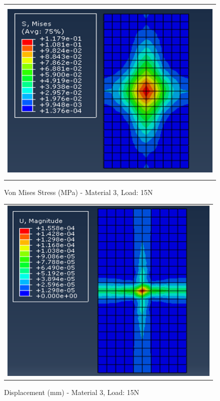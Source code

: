 \documentclass[a4paper,12pt]{article}
\numberwithin{equation}{section}
\numberwithin{figure}{section}
\begin{document}
\begin{figure}[H]
  \centering
  \begin{tabular}{@{}c@{}}
    \includegraphics[width=0.7\linewidth,height=255pt]{Results/Point Loading/M3_VMS_L3.png} \\
  \end{tabular}
  \caption{Von Mises Stress (MPa) - Material 3, Load: 15N}
\end{figure}

\begin{figure}[H]
  \centering
  \begin{tabular}{@{}c@{}}
    \includegraphics[width=0.7\linewidth,height=255pt]{Results/Point Loading/M3_DIS_L3.png} \\
  \end{tabular}
  \caption{Displacement (mm) - Material 3, Load: 15N}
\end{figure}
\end{document}
